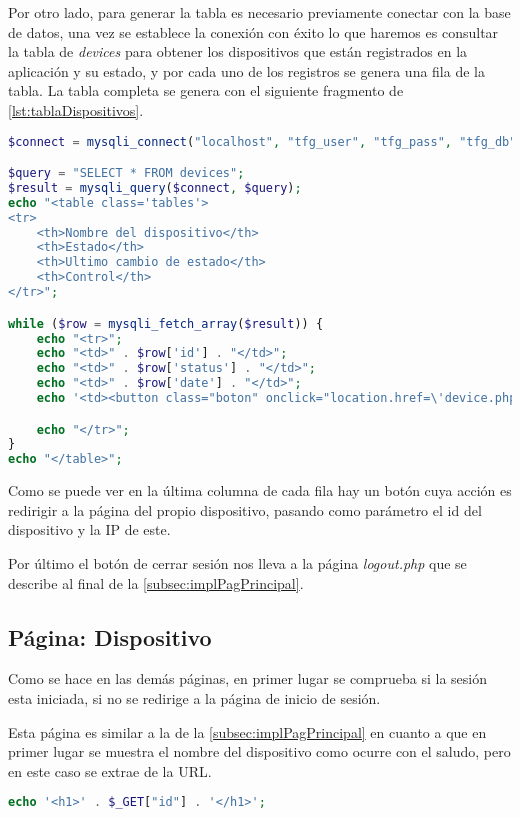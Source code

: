 Por otro lado, para generar la tabla es necesario previamente conectar con la base de datos, una vez se establece la conexión con éxito lo que haremos es consultar la tabla de \textit{devices} para obtener los dispositivos que están registrados en la aplicación y su estado, y por cada uno de los registros se genera una fila de la tabla. La tabla completa se genera con el siguiente fragmento de \autoref{lst:tablaDispositivos}.
\begin{lstlisting}[language=PHP, caption=Visualización de tabla de dispositivos, label=lst:tablaDispositivos]
$connect = mysqli_connect("localhost", "tfg_user", "tfg_pass", "tfg_db");

$query = "SELECT * FROM devices";
$result = mysqli_query($connect, $query);
echo "<table class='tables'>
<tr>
    <th>Nombre del dispositivo</th>
    <th>Estado</th>
    <th>Ultimo cambio de estado</th>
    <th>Control</th>
</tr>";

while ($row = mysqli_fetch_array($result)) {
    echo "<tr>";
    echo "<td>" . $row['id'] . "</td>";
    echo "<td>" . $row['status'] . "</td>";
    echo "<td>" . $row['date'] . "</td>";
    echo '<td><button class="boton" onclick="location.href=\'device.php?id=' . $row['id'] . '&ip=' . $row['ip'] . '\'">Acceder</button></td>';

    echo "</tr>";
}
echo "</table>";
\end{lstlisting}

Como se puede ver en la última columna de cada fila hay un botón cuya acción es redirigir a la página del propio dispositivo, pasando como parámetro el id del dispositivo y la IP de este.

Por último el botón de cerrar sesión nos lleva a la página \textit{logout.php} que se describe al final de la \autoref{subsec:implPagPrincipal}.

\subsection{Página: Dispositivo}
Como se hace en las demás páginas, en primer lugar se comprueba si la sesión esta iniciada, si no se redirige a la página de inicio de sesión. 

Esta página es similar a la de la \autoref{subsec:implPagPrincipal} en cuanto a que en primer lugar se muestra el nombre del dispositivo como ocurre con el saludo, pero en este caso se extrae de la URL.
\begin{lstlisting}[language=PHP, caption=Nombre del dispositivo en la cabecera de la página, label=lst:nombreDispositivo]
echo '<h1>' . $_GET["id"] . '</h1>';
\end{lstlisting}

